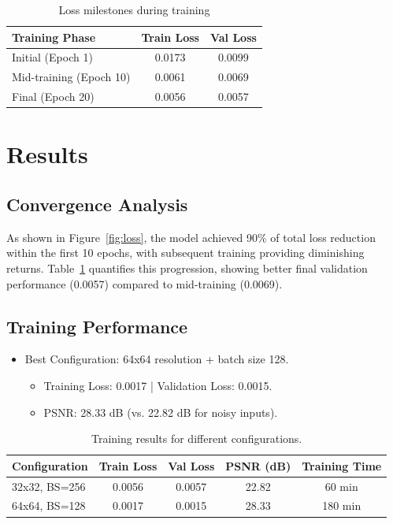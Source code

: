 \documentclass[final]{article}
\begin{document}
\begin{table}[htbp]
\centering
\caption{Loss milestones during training}
\label{tab:loss}
\begin{tabular}{@{}lcc@{}}
\toprule
\textbf{Training Phase} & \textbf{Train Loss} & \textbf{Val Loss} \\
\midrule
Initial (Epoch 1) & 0.0173 & 0.0099 \\
Mid-training (Epoch 10) & 0.0061 & 0.0069 \\
Final (Epoch 20) & 0.0056 & 0.0057 \\
\bottomrule
\end{tabular}
\end{table}


\section{Results}
\subsection{Convergence Analysis}
As shown in Figure~\ref{fig:loss}, the model achieved 90\% of total loss reduction within the first 10 epochs, with subsequent training providing diminishing returns. Table~\ref{tab:loss} quantifies this progression, showing better final validation performance (0.0057) compared to mid-training (0.0069).


\subsection{Training Performance}
    \begin{itemize}
    \item Best Configuration: 64x64 resolution + batch size 128.
    \begin{itemize}
    \item Training Loss: 0.0017 | Validation Loss: 0.0015.
    \item PSNR: 28.33 dB (vs. 22.82 dB for noisy inputs).
    \end{itemize}
    \end{itemize}

\begin{table}[h]
    \centering
    \begin{tabular}{lcccc}
        \hline
        Configuration & Train Loss & Val Loss & PSNR (dB) & Training Time \\
        \hline
        32x32, BS=256 & 0.0056 & 0.0057 & 22.82 & 60 min \\
        64x64, BS=128 & 0.0017 & 0.0015 & 28.33 & 180 min \\
        \hline
    \end{tabular}
    \caption{Training results for different configurations.}
    \label{tab:training_results}
\end{table}
\end{document}
